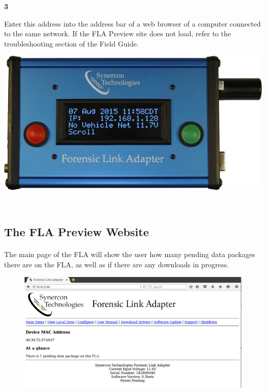 \documentclass[11pt]{article}
\begin{document}
\noindent\begin{minipage}{0.3\textwidth}%
\begin{center}
\textbf{3}\\[\baselineskip]
\end{center}
Enter this address into the address bar of a web browser of a computer connected to the same network. If the FLA Preview site does not load, refer to the troubleshooting section of the Field Guide.
\end{minipage}%
\hfill%
\begin{minipage}{0.6\textwidth}
\includegraphics[width=\linewidth]{../../media/fla_screens/ethernet_and_others/main/title_no_net}
\end{minipage}\\[\baselineskip]
\subsection{The FLA Preview Website}
\paragraph{}
The main page of the FLA will show the user how many pending data packages there are on the FLA, as well as if there are any downloads in progress.
\begin{figure}[tbph]
\centering
\includegraphics[width=.95\linewidth]{../../media/fla_preview_screenshots/main_page}
\label{fig:fla_preview_main_page}
\end{figure}
\end{document}
